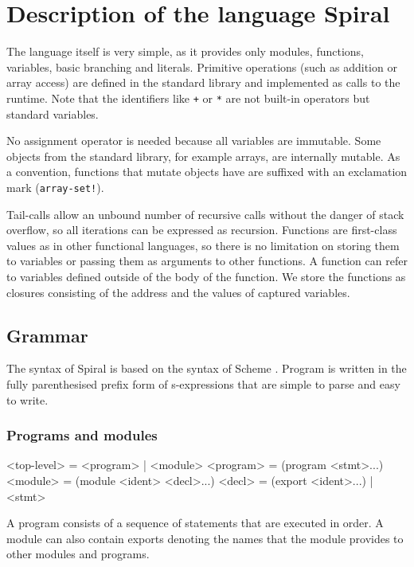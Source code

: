 \chapter{Description of the language Spiral}

The language itself is very simple, as it provides only modules, functions,
variables, basic branching and literals. Primitive operations (such as
addition or array access) are defined in the standard library and implemented as
calls to the runtime. Note that the identifiers like \texttt{+} or \texttt{*}
are not built-in operators but standard variables.

No assignment operator is needed because all variables are immutable. Some
objects from the standard library, for example arrays, are internally mutable.
As a convention, functions that mutate objects have are suffixed with an
exclamation mark (\texttt{array-set!}).

Tail-calls allow an unbound number of recursive calls without the danger of
stack overflow, so all iterations can be expressed as recursion. Functions are
first-class values as in other functional languages, so there is no limitation
on storing them to variables or passing them as arguments to other functions. A
function can refer to variables defined outside of the body of the function.
We store the functions as closures consisting of the address and the values of
captured variables.

\section{Grammar}

The syntax of Spiral is based on the syntax of Scheme \cite{scheme7}. Program is
written in the fully parenthesised prefix form of s-expressions that are simple
to parse and easy to write.

\subsection{Programs and modules}
\begin{ttcode}
<top-level>   = <program> | <module>
<program>     = (program <stmt>...)
<module>      = (module <ident> <decl>...)
<decl>        = (export <ident>...) | <stmt>
\end{ttcode}

A program consists of a sequence of statements that are executed in order. A
module can also contain exports denoting the names that the module provides to
other modules and programs.

